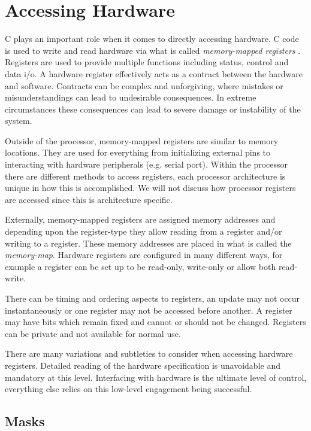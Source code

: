 \section{Accessing Hardware} \label{Hardware}

C plays an important role when it comes to directly accessing hardware. C code is used to write and read hardware via what is called \textit{memory-mapped registers} . Registers are used to provide multiple functions including status, control and data i/o. A hardware register effectively acts as a contract between the hardware and software. Contracts can be complex and unforgiving, where mistakes or misunderstandings can lead to undesirable consequences. In extreme circumstances these consequences can lead to severe damage or instability of the system. 

 Outside of the processor, memory-mapped registers are similar to memory locations. They are used for everything from initializing external pins to interacting with hardware peripherals (e.g. serial port). Within the processor there are different methods to access registers, each processor architecture is unique in how this is accomplished. We will not discuss how processor registers are accessed since this is architecture specific. 
 
 Externally, memory-mapped registers are assigned memory addresses and depending upon the register-type they allow reading from a register and/or writing to a register. These memory addresses are placed in what is called the \textit{memory-map}. Hardware registers are configured in many different ways, for example a register can be set up to be read-only, write-only or allow both read-write. 
 
 There can be timing and ordering aspects to registers, an update may not occur instantaneously or one register may not be accessed before another. A register may have bits which remain fixed and cannot or should not be changed. Registers can be private and not available for normal use. 
 
There are many variations and subtleties to consider when accessing hardware registers. Detailed reading of the hardware specification is unavoidable and mandatory at this level. Interfacing with hardware is the ultimate level of control, everything else relies on this low-level engagement being successful.

\subsection{Masks} 

